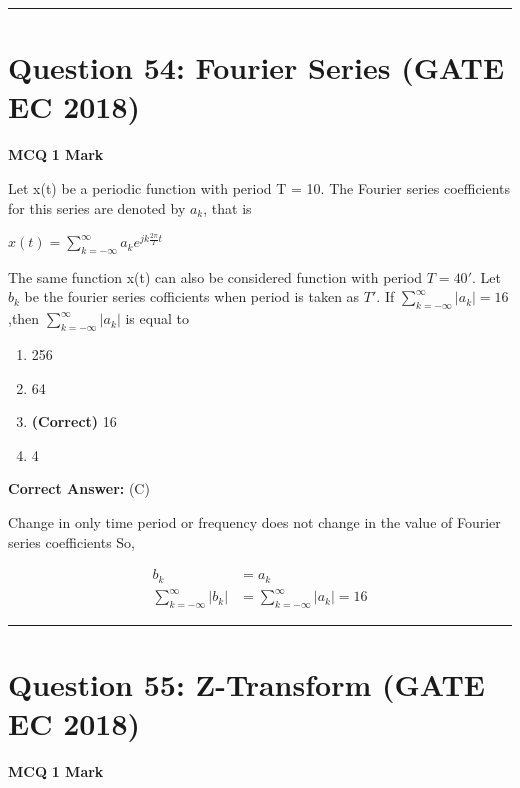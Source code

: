 \documentclass[11pt,a4paper]{article}
\begin{document}
\vspace{1.5em}
\hrule
\vspace{1.5em}

\section*{Question 54: Fourier Series (GATE EC 2018)}
\noindent \textbf{\color{primary}MCQ} \hfill \textbf{\color{secondary}1 Mark}


\noindent Let x(t) be a periodic function with period T = 10. The Fourier series coefficients for this
series are denoted by $a_{k}$, that is 

$x(t)=\sum_{k=-\infty }^{\infty }a_{k}e^{jk\frac{2\pi }{T}t}$

 The same function x(t) can also be considered function with period ${T=40}'$. Let $b_{k}$ be the fourier series cofficients when period is taken as ${T}'$. If  $\sum_{k=-\infty}^{\infty}|a_{k}|=16$ ,then $\sum_{k=-\infty}^{\infty}|a_{k}|$ is equal to


\begin{enumerate}[label=(\Alph*)]
    \item 256
    \item 64
    \item \textbf{(Correct)} 16
    \item 4
\end{enumerate}

\noindent \textbf{Correct Answer:} (C)

\begin{tcolorbox}[solbox, title=Detailed Solution -- Question 54]
Change in only time period or frequency does not change in the value of Fourier series coefficients
 So, 

\[
\begin{aligned} b_{k} &=a_{k} \\ \sum_{k=-\infty}^{\infty}\left|b_{k}\right| &=\sum_{k=-\infty}^{\infty}\left|a_{k}\right|=16 \end{aligned}
\]
\end{tcolorbox}

\vspace{1.5em}
\hrule
\vspace{1.5em}

\section*{Question 55: Z-Transform (GATE EC 2018)}
\noindent \textbf{\color{primary}MCQ} \hfill \textbf{\color{secondary}1 Mark}
\end{document}
